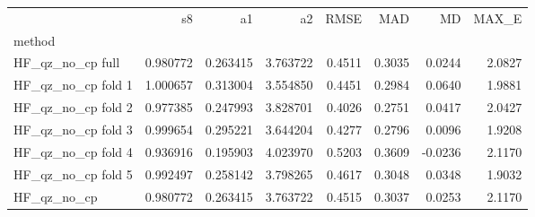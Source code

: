 \begin{tabular}{lrrrrrrr}
 & s8 & a1 & a2 & RMSE & MAD & MD & MAX_E \\
method &  &  &  &  &  &  &  \\
HF_qz_no_cp full & 0.980772 & 0.263415 & 3.763722 & 0.4511 & 0.3035 & 0.0244 & 2.0827 \\
HF_qz_no_cp fold 1 & 1.000657 & 0.313004 & 3.554850 & 0.4451 & 0.2984 & 0.0640 & 1.9881 \\
HF_qz_no_cp fold 2 & 0.977385 & 0.247993 & 3.828701 & 0.4026 & 0.2751 & 0.0417 & 2.0427 \\
HF_qz_no_cp fold 3 & 0.999654 & 0.295221 & 3.644204 & 0.4277 & 0.2796 & 0.0096 & 1.9208 \\
HF_qz_no_cp fold 4 & 0.936916 & 0.195903 & 4.023970 & 0.5203 & 0.3609 & -0.0236 & 2.1170 \\
HF_qz_no_cp fold 5 & 0.992497 & 0.258142 & 3.798265 & 0.4617 & 0.3048 & 0.0348 & 1.9032 \\
HF_qz_no_cp & 0.980772 & 0.263415 & 3.763722 & 0.4515 & 0.3037 & 0.0253 & 2.1170 \\
\end{tabular}
